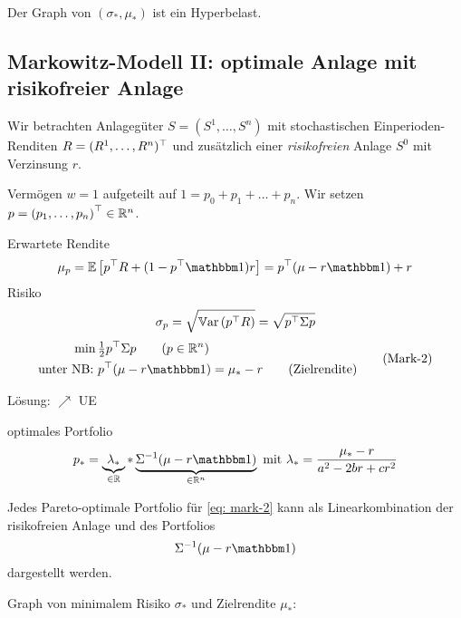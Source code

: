Der Graph von $(\sigma_\ast, \mu_\ast)$ ist ein Hyperbelast.

\pagebreak

\subsection{Markowitz-Modell II: optimale Anlage mit risikofreier Anlage}
Wir betrachten Anlagegüter $S = (S^1, \dots, S^n)$ mit stochastischen Einperioden-Renditen $R=\trans{(R^1, \dots, R^n)}$ und zusätzlich einer \textit{risikofreien} Anlage $S^0$ mit Verzinsung $r$.

Vermögen $w=1$ aufgeteilt auf $1 = p_0 + p_1 + \dots + p_n$. Wir setzen $p = \transpose{p_1, \dots, p_n} \in \Rn$. 

Erwartete Rendite
\begin{equation*}
	\mu_p = \EW[\trans{p} R + (1 - \trans{p}\one) r] = \trans{p} (\mu - r \one) + r
\end{equation*}
Risiko
\begin{equation*}
	\sigma_p = \sqrt{\Var[\trans{p}R]} = \sqrt{\trans{p} \Sigma p}
\end{equation*}
\begin{equation*}
	\begin{aligned}
		\min \, &\tfrac{1}{2} \trans{p} \Sigma p \qquad (p \in \Rn) \\
		\text{unter NB: } &\trans{p} (\mu - r\one) = \mu_\ast - r \qquad\text{(Zielrendite)}
	\end{aligned}
	\tag{Mark-2} \label{eq: mark-2}
\end{equation*}

Lösung: $\nearrow$ UE

optimales Portfolio
\begin{equation*}
	p_\ast = \underbrace{\lambda_\ast}_{\in \R} * \underbrace{\Sigma^{-1} (\mu - r \one)}_{\in \Rn} \mit \lambda_\ast = \frac{\mu_\ast - r}{a^2 - 2br + cr^2}
\end{equation*}

\begin{korollar}
	Jedes Pareto-optimale Portfolio für \eqref{eq: mark-2} kann als Linearkombination der risikofreien Anlage und des Portfolios 
	\begin{equation*}
		\Sigma^{-1} (\mu - r \one)
	\end{equation*}
	dargestellt werden.
\end{korollar}

Graph von minimalem Risiko $\sigma_\ast$ und Zielrendite $\mu_\ast$:


